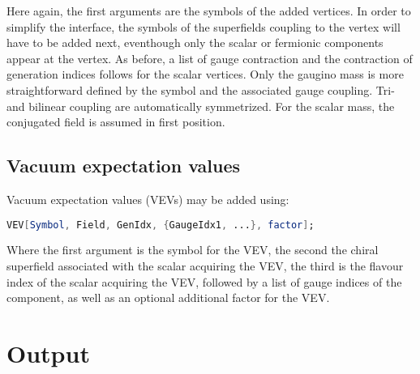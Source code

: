 \documentclass{scrartcl}
\begin{document}
Here again, the first arguments are the symbols of the added vertices. In order to simplify the interface, the symbols of the superfields coupling to the vertex will have to be added next, eventhough only the scalar or fermionic components appear at the vertex. As before, a list of gauge contraction and the contraction of generation indices follows for the scalar vertices. Only the gaugino mass is more straightforward defined by the symbol and the associated gauge coupling. Tri- and bilinear coupling are automatically symmetrized. For the scalar mass, the conjugated field is assumed in first position. 
\subsection{Vacuum expectation values}
Vacuum expectation values (VEVs) may be added using:
\begin{lstlisting}[language=mathematica,mathescape,columns=flexible,backgroundcolor=\color{light-gray}]
VEV[Symbol, Field, GenIdx, {GaugeIdx1, ...}, factor];
\end{lstlisting}
Where the first argument is the symbol for the VEV, the second the chiral superfield associated with the scalar acquiring the VEV, the third is the flavour index of the scalar acquiring the VEV, followed by a list of gauge indices of the component, as well as an optional additional factor for the VEV.
\FloatBarrier
\section{Output}
\end{document}

